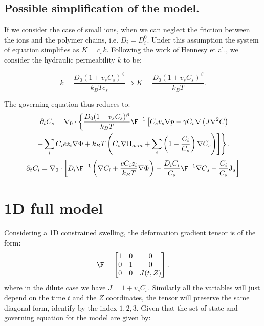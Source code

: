 \subsection{Possible simplification of the model.}

If we consider  the case of small ions, when we can neglect the friction between the ions and the polymer chains, i.e. $D_{i}=D^0_i$. Under this assumption the system of equation simplifies as $K=c_sk$. Following the work of Hennesy et al., we consider the hydraulic permeability $k$ to be:

\begin{equation}
k = \frac{D_0(1+v_sC_s)^\beta}{k_B T c_s} \Rightarrow K=  \frac{D_0(1+v_sC_s)^\beta}{k_B T}.
\end{equation}

The governing equation thus reduces to:
\begin{eqnarray}
\begin{aligned}
\partial_t C_s=\nabla_0 \cdot\left\{\frac{D_0(1+v_sC_s)^\beta}{k_B T}\F^{-1}\left[C_s v_s\nabla p - \gamma C_s \nabla  \left(J\nabla^2 C\right)\right.\right.\\
\left.\left.+\sum_i C_i e z_i \nabla \Phi+ k_B T \left(C_s \nabla \Pi_{osm}+ \sum_i\left(1-\frac{C_i}{C_s}\right) \nabla C_s \right)\right]\right\}.
\end{aligned}\label{A}
\end{eqnarray}
\begin{eqnarray}
\partial_t C_i = \nabla_0 \cdot\left[D_i\F^{-1}\left(\nabla C_i +\frac{eC_iz_i}{k_B T} \nabla \Phi\right)-\frac{D_i C_i}{C_s}\F^{-1}\nabla C_s-\frac{C_i}{C_s}\mathbf{J}_s\right]\label{B}
\end{eqnarray}

\section{1D full model}

Considering a 1D constrained swelling, the deformation gradient tensor is of the form:
\begin{equation}
\F= \begin{bmatrix}
1 & 0 &0\\
0 & 1 &0\\
0 & 0 &J(t,Z)\\
\end{bmatrix}.\label{deffree}                                                                
\end{equation}
where in the dilute case we have $J=1+v_sC_s$.
Similarly all the variables will just depend on the time $t$ and the $Z$ coordinates, the tensor will preserve the same diagonal form, identify by the index $1,2,3$. Given that the set of state and governing equation for the model are given by:

